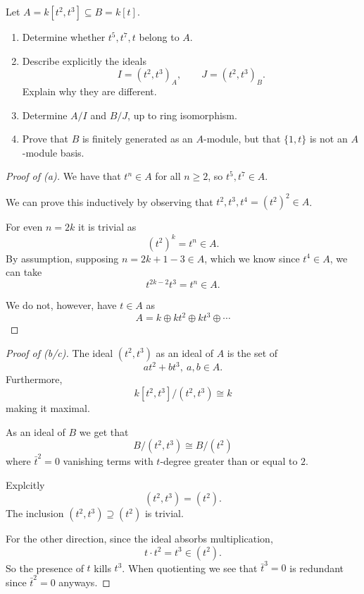 \documentclass[11pt]{article}
\begin{document}
\begin{prob*}
    Let \(A=k[t^2,t^3]\subseteq B=k[t]\).

    \begin{enumerate}[label=\alph*)]
        \item Determine whether \(t^5,t^7,t\)
        belong to \(A\).

        \item Describe explicitly the ideals
        \[
            I=(t^2,t^3)_A,\qquad
            J=(t^2,t^3)_B.
        \]
        Explain why they are different.

        \item Determine \(A/I\) and \(B/J\),
        up to ring isomorphism.

        \item Prove that \(B\) is finitely generated
        as an \(A\)-module, but that \(\{1,t\}\)
        is not an \(A\)-module basis.
    \end{enumerate}
\end{prob*}
\begin{proof}[Proof of (a)]
    We have that $t^n \in A$ for all $n \geq 2$, so 
    $t^5,t^7 \in A$. 
    
    We can prove this inductively by observing that 
    $t^2, t^3, t^4 = (t^2)^2 \in A$. 

    For even $n = 2k$ it is trivial as 
    \[
        (t^2)^k = t^n \in A.     
    \]
    By assumption, supposing $n = 2k + 1 - 3 \in A$, which 
    we know since $t^4 \in A$, we can take 
    \[
        t^{2k-2}t^3 = t^n \in A. 
    \]

    We do not, however, have $t \in A$ 
    as 
    \[
        A = k \oplus kt^2 \oplus kt^3 \oplus 
        \cdots
    \]
    
\end{proof}
\begin{proof}[Proof of (b/c)]
    The ideal $(t^2,t^3)$ as an ideal of $A$ is the set of 
    \[
        at^2 + bt^3, \ a,b \in A. 
    \]
    Furthermore, 
    \[
        k[t^2,t^3]/(t^2,t^3) \cong k 
    \]
    making it maximal. 

    As an ideal of $B$ we get that 
    \[
        B/(t^2,t^3) \cong B/(t^2)
    \]
    where $\bar t^2 = 0$ vanishing terms with $t$-degree 
    greater than or equal to $2$.

    Explcitly 
    \[
        (t^2,t^3) = (t^2).  
    \]
    The inclusion $(t^2,t^3) \supseteq (t^2)$ is trivial. 

    For the other direction, since the ideal 
    absorbs multiplication, 
    \[
        t \cdot t^2 = t^3 \in (t^2). 
    \]
    So the presence of $t$ kills $t^3$. When quotienting 
    we see that $\bar t^3 = 0$ is redundant since 
    $\bar t^2 = 0$ anyways. 
\end{proof}
\end{document}
